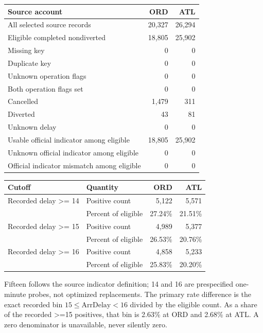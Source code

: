\documentclass[11pt,letterpaper]{article}
\newcommand{\heading}[1]{\vspace{4pt}{\large\bfseries #1}\par}
\newcommand{\BoundL}{20,327}
\newcommand{\BoundM}{26,294}
\newcommand{\BoundN}{18,805}
\newcommand{\BoundO}{25,902}
\newcommand{\BoundP}{0}
\newcommand{\BoundQ}{0}
\newcommand{\BoundR}{0}
\newcommand{\BoundS}{0}
\newcommand{\BoundT}{0}
\newcommand{\BoundU}{0}
\newcommand{\BoundV}{0}
\newcommand{\BoundW}{0}
\newcommand{\BoundX}{1,479}
\newcommand{\BoundY}{311}
\newcommand{\BoundZ}{43}
\newcommand{\BoundAA}{81}
\newcommand{\BoundAB}{0}
\newcommand{\BoundAC}{0}
\newcommand{\BoundAD}{18,805}
\newcommand{\BoundAE}{25,902}
\newcommand{\BoundAF}{0}
\newcommand{\BoundAG}{0}
\newcommand{\BoundAH}{0}
\newcommand{\BoundAI}{0}
\newcommand{\BoundAJ}{5,122}
\newcommand{\BoundAK}{5,571}
\newcommand{\BoundAL}{27.24}
\newcommand{\BoundAM}{21.51}
\newcommand{\BoundAN}{4,989}
\newcommand{\BoundAO}{5,377}
\newcommand{\BoundAP}{26.53}
\newcommand{\BoundAQ}{20.76}
\newcommand{\BoundAR}{4,858}
\newcommand{\BoundAS}{5,233}
\newcommand{\BoundAT}{25.83}
\newcommand{\BoundAU}{20.20}
\newcommand{\BoundAV}{2.63}
\newcommand{\BoundAW}{2.68}
\begin{document}
{\small\setlength{\tabcolsep}{7pt}
\begin{tabular}{@{}lrr@{}}\toprule
Source account & ORD & ATL\\\midrule
All selected source records & \BoundL{} & \BoundM{} \\
Eligible completed nondiverted & \BoundN{} & \BoundO{} \\
Missing key & \BoundP{} & \BoundQ{} \\
Duplicate key & \BoundR{} & \BoundS{} \\
Unknown operation flags & \BoundT{} & \BoundU{} \\
Both operation flags set & \BoundV{} & \BoundW{} \\
Cancelled & \BoundX{} & \BoundY{} \\
Diverted & \BoundZ{} & \BoundAA{} \\
Unknown delay & \BoundAB{} & \BoundAC{} \\
Usable official indicator among eligible & \BoundAD{} & \BoundAE{} \\
Unknown official indicator among eligible & \BoundAF{} & \BoundAG{} \\
Official indicator mismatch among eligible & \BoundAH{} & \BoundAI{} \\
\bottomrule\end{tabular}}

\heading{All fixed recorded-minute thresholds}
{\small\setlength{\tabcolsep}{7pt}
\begin{tabular}{@{}llrr@{}}\toprule
Cutoff & Quantity & ORD & ATL\\\midrule
Recorded delay >= 14 & Positive count & \BoundAJ{} & \BoundAK{} \\
 & Percent of eligible & \BoundAL{}\% & \BoundAM{}\% \\
Recorded delay >= 15 & Positive count & \BoundAN{} & \BoundAO{} \\
 & Percent of eligible & \BoundAP{}\% & \BoundAQ{}\% \\
Recorded delay >= 16 & Positive count & \BoundAR{} & \BoundAS{} \\
 & Percent of eligible & \BoundAT{}\% & \BoundAU{}\% \\
\bottomrule\end{tabular}}

Fifteen follows the source indicator definition; 14 and 16 are prespecified one-minute probes, not optimized replacements. The primary rate difference is the exact recorded bin $15 \leq \text{ArrDelay}<16$ divided by the eligible count. As a share of the recorded >=15 positives, that bin is \BoundAV{}\% at ORD and \BoundAW{}\% at ATL. A zero denominator is unavailable, never silently zero.
\end{document}
